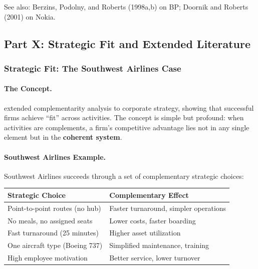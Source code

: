 See also: Berzins, Podolny, and Roberts (1998a,b) on BP; 
Doornik and Roberts (2001) on Nokia.



\subsection{Part X: Strategic Fit and Extended Literature}
\label{sec:strategic-fit}

\subsubsection{Strategic Fit: The Southwest Airlines Case}

\paragraph{The Concept.}
\citet{milgromroberts1995} extended complementarity analysis to corporate strategy,
showing that successful firms achieve ``fit'' across activities. The concept is
simple but profound: when activities are complements, a firm's competitive
advantage lies not in any single element but in the \textbf{coherent system}.

\paragraph{Southwest Airlines Example.}
Southwest Airlines succeeds through a set of complementary strategic choices:

\begin{center}
\renewcommand{\arraystretch}{1.3}
\begin{tabular}{|l|l|}
\hline
\textbf{Strategic Choice} & \textbf{Complementary Effect} \\
\hline
Point-to-point routes (no hub) & Faster turnaround, simpler operations \\
No meals, no assigned seats & Lower costs, faster boarding \\
Fast turnaround (25 minutes) & Higher asset utilization \\
One aircraft type (Boeing 737) & Simplified maintenance, training \\
High employee motivation & Better service, lower turnover \\
\hline
\end{tabular}
\end{center}

